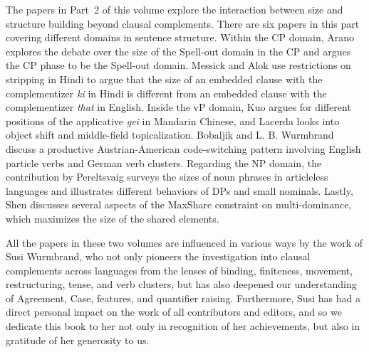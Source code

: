 \documentclass[output=paper]{langscibook}
\begin{document}
The papers in Part~2 of this volume explore the interaction between size and structure building beyond clausal complements. 
There are six papers in this part covering different domains in sentence structure.
Within the CP domain, Arano explores the debate over the size of the Spell-out domain in the CP and argues the CP phase to be the Spell-out domain. 
Messick and Alok use restrictions on stripping in Hindi to argue that the size of an embedded clause with the complementizer \textit{ki} in Hindi is different from an embedded clause with the complementizer \textit{that} in English. 
Inside the vP domain, Kuo argues for different positions of the applicative \textit{gei} in Mandarin Chinese, and  
Lacerda looks into object shift and middle-field topicalization. 
Bobaljik and L. B. Wurmbrand discuss a productive Austrian-American code-switching pattern involving English particle verbs and German verb clusters. 
Regarding the NP domain, 
the contribution by Pereltsvaig surveys the sizes of noun phrases in articleless languages and illustrates different behaviors of DPs and small nominals. 
Lastly, Shen discusses several aspects of the MaxShare constraint on multi-dominance, which maximizes the size of the shared elements. 

All the papers in these two volumes are influenced in various ways by the work of Susi Wurmbrand, who not only pioneers the investigation into clausal complements across languages from the lenses of 
binding, finiteness, movement, restructuring, tense, and verb clusters, 
but has also deepened our understanding of 
Agreement, Case, features, and quantifier raising. 
Furthermore, Susi has had a direct personal impact on the work of all contributors and editors, and so we dedicate this book to her not only in recognition of her achievements, but also in gratitude of her generosity to us. 


{\sloppy\printbibliography[heading=subbibliography,notkeyword=this]}
\end{document}
